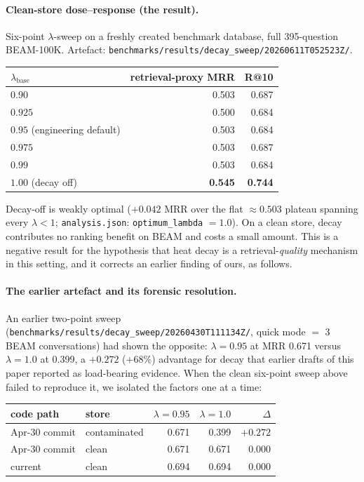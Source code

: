 \documentclass[11pt]{article}
\begin{document}
\paragraph{Clean-store dose--response (the result).}
Six-point $\lambda$-sweep on a freshly created benchmark database,
full 395-question BEAM-100K.  Artefact:
\texttt{benchmarks/results/decay\_sweep/20260611T052523Z/}.

\begin{center}
\small
\begin{tabular}{lrr}
\toprule
$\lambda_{\mathrm{base}}$ & retrieval-proxy MRR & R@10 \\
\midrule
$0.90$  & 0.503 & 0.687 \\
$0.925$ & 0.500 & 0.684 \\
$0.95$ (engineering default) & 0.503 & 0.684 \\
$0.975$ & 0.503 & 0.687 \\
$0.99$  & 0.503 & 0.684 \\
$1.00$ (decay off) & \textbf{0.545} & \textbf{0.744} \\
\bottomrule
\end{tabular}
\end{center}

Decay-off is weakly optimal ($+0.042$ MRR over the flat
$\approx 0.503$ plateau spanning every $\lambda < 1$;
\texttt{analysis.json}: \texttt{optimum\_lambda} $= 1.0$).  On a
clean store, decay contributes no ranking benefit on BEAM and costs
a small amount.  This is a negative result for the hypothesis that
heat decay is a retrieval-\emph{quality} mechanism in this setting,
and it corrects an earlier finding of ours, as follows.

\paragraph{The earlier artefact and its forensic resolution.}
An earlier two-point sweep
(\texttt{benchmarks/results/decay\_sweep/20260430T111134Z/}, quick
mode $=$ 3 BEAM conversations) had shown the opposite: $\lambda =
0.95$ at MRR 0.671 versus $\lambda = 1.0$ at 0.399, a $+0.272$
($+68\%$) advantage for decay that earlier drafts of this paper
reported as load-bearing evidence.  When the clean six-point sweep
above failed to reproduce it, we isolated the factors one at a time:

\begin{center}
\small
\begin{tabular}{llrrr}
\toprule
code path & store & $\lambda{=}0.95$ & $\lambda{=}1.0$ & $\Delta$ \\
\midrule
Apr-30 commit & contaminated & 0.671 & 0.399 & $+0.272$ \\
Apr-30 commit & clean        & 0.671 & 0.671 & $0.000$ \\
current       & clean        & 0.694 & 0.694 & $0.000$ \\
\bottomrule
\end{tabular}
\end{center}
\end{document}

